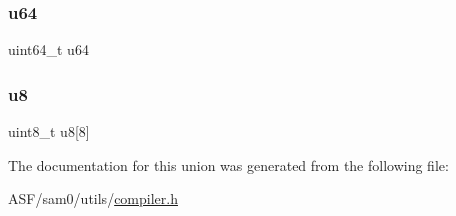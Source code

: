 \subsubsection{\texorpdfstring{u64}{u64}}
{\footnotesize\ttfamily uint64\+\_\+t u64}

\mbox{\label{union_union64_afb01169b5cea6662c70b70de797d5b8e}} 
\subsubsection{\texorpdfstring{u8}{u8}}
{\footnotesize\ttfamily uint8\+\_\+t u8\mbox{[}8\mbox{]}}



The documentation for this union was generated from the following file\+:\begin{DoxyCompactItemize}
\item 
A\+S\+F/sam0/utils/\mbox{\hyperlink{compiler_8h}{compiler.\+h}}\end{DoxyCompactItemize}
